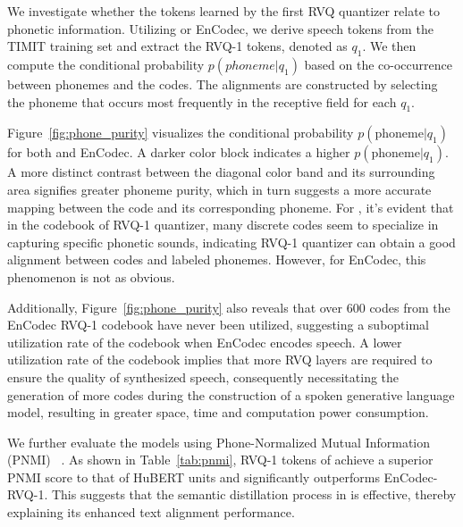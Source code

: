 

We investigate whether the tokens learned by the first RVQ quantizer
relate to phonetic information.
Utilizing \method or EnCodec, we derive speech tokens from the TIMIT training set and extract the RVQ-1 tokens, denoted as $q_1$. We then compute the conditional probability $p(phoneme|q_1)$ based on the co-occurrence
between phonemes and the codes. The alignments are constructed by selecting the phoneme that occurs most frequently in the receptive field for each $q_1$.

Figure~\ref{fig:phone_purity} visualizes the conditional probability $p(\text{phoneme}|q_1)$ for both \method and EnCodec. A darker color block indicates a higher $p(\text{phoneme}|q_1)$. 
A more distinct contrast between the diagonal color band and its surrounding area signifies greater phoneme purity, which in turn suggests a more accurate mapping between the code and its corresponding phoneme.
For \method, it's evident that in the codebook of RVQ-1 quantizer, many discrete codes seem to specialize in capturing specific phonetic sounds, indicating RVQ-1 quantizer can obtain a good alignment between codes and labeled phonemes. However, for EnCodec, this phenomenon is not as obvious.

Additionally, Figure~\ref{fig:phone_purity} also reveals that over 600 codes from the EnCodec RVQ-1 codebook have never been utilized, suggesting a suboptimal utilization rate of the codebook when EnCodec encodes speech. A lower utilization rate of the codebook implies that more RVQ layers are required to ensure the quality of synthesized speech, consequently necessitating the generation of more codes during the construction of a spoken generative language model, resulting in greater space, time and computation power consumption.

We further evaluate the models using Phone-Normalized Mutual Information (PNMI) ~\citep{hsu2021hubert}. As shown in Table~\ref{tab:pnmi}, RVQ-1 tokens of \method achieve a superior PNMI score to that of HuBERT units and significantly outperforms EnCodec-RVQ-1. This suggests that the semantic distillation process in \method is effective, thereby explaining its enhanced text alignment performance.



